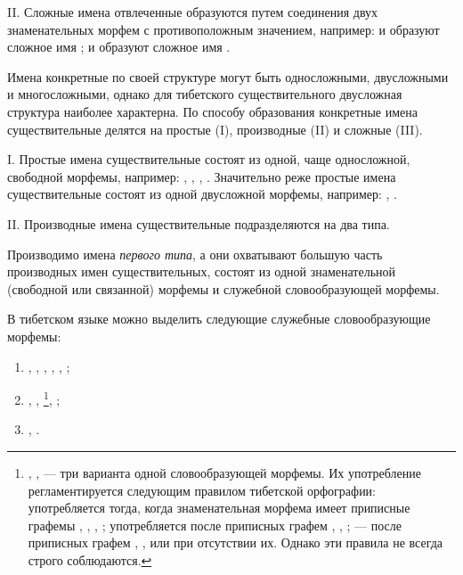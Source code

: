 II. Сложные имена отвлеченные образуются путем соединения двух знаменательных морфем с противоположным значением, например:  и  образуют сложное имя ;  и  образуют сложное имя .

Имена конкретные по своей структуре могут быть односложными, двусложными и многосложными, однако для тибетского существительного двусложная структура наиболее характерна. По способу образования конкретные имена существительные делятся на простые (I), производные (II) и сложные (III).

I. Простые имена существительные состоят из одной, чаще односложной, свободной морфемы, например: ,  , , . Значительно реже простые имена существительные состоят из одной двусложной морфемы, например: , .

II. Производные имена существительные подразделяются на два типа.

Производимо имена \emph{первого типа}, а они охватывают большую часть производных имен существительных, состоят из одной знаменательной (свободной или связанной) морфемы и служебной словообразующей морфемы.

В тибетском языке можно выделить следующие служебные словообразующие морфемы:

\begin{enumerate}
    \item {}, , , , , ;
    \item {}, , 
    \footnote[25]{, ,  --- три варианта одной словообразующей морфемы. Их употребление регламентируется следующим правилом тибетской орфографии:  употребляется тогда, когда знаменательная морфема имеет приписные графемы , , , ;  употребляется после приписных графем , , ;  --- после приписных графем , ,  или при отсутствии их. Однако эти правила не всегда строго соблюдаются.},
    ;
    \item {}, .
\end{enumerate}

